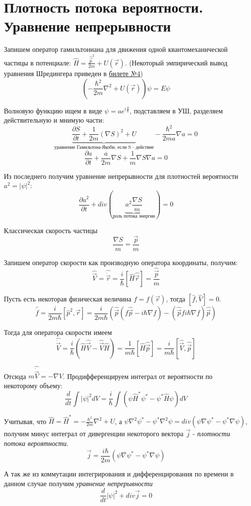 \newpage
\chapter{Плотность потока вероятности. Уравнение непрерывности}
\par Запишем оператор гамильтониана для движения одной квантомеханической частицы в потенциале: $\hat{H} =\frac{\hat{\vec{p}}^2}{2m}+U(\vec{r})$. (Некоторый эмпирический вывод уравнения Шредингера приведен в \hyperref[]{билете №4})
$$(-\frac{\hbar^2}{2m} \nabla^2+U(\vec{r}))\psi = E \psi $$
\par Волновую функцию ищем в виде $\psi = a e^{i \frac{S}{\hbar}}$, подставляем в УШ, разделяем действительную и мнимую части:
$$\underbrace{\frac{\partial S}{\partial t} +\frac{1}{2m}(\nabla S)^2+ U}_{\text{уравнение Гамильтона-Якоби, если S - действие}} - \frac{\hbar^2}{2ma}\nabla a =0$$
$$\frac{\partial a}{\partial t} +\frac{a}{2m}\nabla S+\frac{1}{m}\nabla S \nabla a =0$$
\par Из последнего получим уравнение непрерывности для плотностей вероятности $a^2 = |\psi|^2$:
$$ \frac{\partial a^2}{\partial t} + div (\underbrace{a^2 \frac{\nabla S}{m}}_{\text{роль потока энергии}}) = 0$$
\par Классическая скорость частицы 
$$\frac{\nabla S}{m} = \frac{\vec{p}}{m}$$
\par Запишем оператор скорости как производную оператора координаты, получим:
$$\hat{\vec{V}}=\hat{\dot{\vec{r}}}=\frac{i}{\hbar}[\hat{H}\hat{\vec{r}}]=\frac{\hat{\vec{p}}}{m}$$
\par Пусть есть некоторая физическая величина $f=f(\vec{r})$, тогда $[\hat{f}, \hat{V}]=0$.
$$\hat{\dot{f}}=\frac{i}{2m\hbar}[\hat{p}^2, \vec{r}]=\frac{i}{2m\hbar} \left( \hat{\vec{p}}(f\hat{\vec{p}}-i\hbar\nabla f)-(\hat{\vec{p}}f i \hbar \nabla f)\hat{\vec{p}} \right) $$
\par Тогда для оператора скорости имеем
$$\hat{\dot{\vec{V}}} = \frac{i}{\hbar} \left( \hat{H} \hat{\vec{V}} - \hat{\vec{V}} \hat{H} \right) = \frac{1}{m\hbar} [ \hat{H}  \hat{\vec{p}}] = \frac{i}{m \hbar} [ \hat{\vec{V}},\hat{\vec{p}}]$$
\par Отсюда $m \hat{\dot{\vec{V}}}=- \nabla V$. Продифференцируем интеграл от вероятности по некоторому объему:
$$\frac{d}{dt} \int |\psi|^2 dV = \frac{i}{\hbar} \int \left(\psi \hat{H}^* \psi^* - \psi^* \hat{H} \psi \right)dV $$
\par Учитывая, что $\hat{H}=\hat{H}^*=-\frac{\hbar^2}{2m}\nabla^2 + U$, а $\psi \nabla^2 \psi^* - \psi^* \nabla^2 \psi = div(\psi \nabla \psi^* - \psi^* \nabla \psi )$, получим минус интеграл от дивергенции некоторого вектора $\vec{j}$ - \textit{плотности потока вероятности}.
$$ \vec{j} = \frac{i \hbar}{2m} \left(\psi \nabla \psi^* - \psi^* \nabla \psi \right)$$
\par А так же из коммутации интегрирования и дифференцирования по времени в данном случае получим \textit{уравнение непрерывности}
$$\frac{d}{dt}  |\psi|^2+div\vec{j} =0 $$
